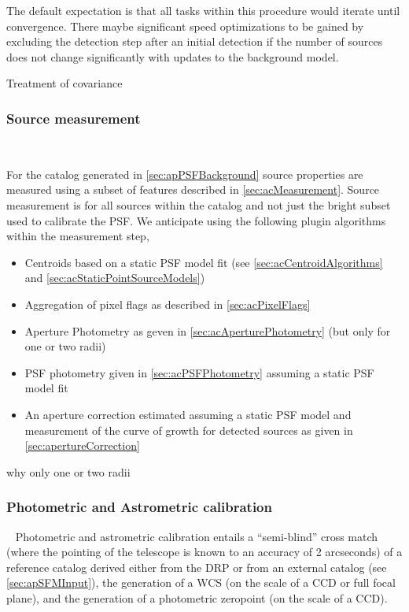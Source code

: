 The default expectation is that all tasks within this procedure would iterate until convergence.  There maybe significant speed optimizations to be gained by excluding the \Source detection step after an initial detection if the number of sources does not change significantly with updates to the background model.

\begin{note} Treatment of covariance \end{note}


\subsubsection{Source measurement}~
\label{sec:apSourcemeasurement}

For the \Source catalog generated in \ref{sec:apPSFBackground} source properties are measured using a subset of features described in \ref{sec:acMeasurement}. Source measurement is for all sources within the \Source catalog and not just the bright subset used to calibrate the PSF.  We anticipate using the following plugin algorithms within the \Source measurement step,
\begin{itemize}
\item Centroids based on a static PSF model fit (see \ref{sec:acCentroidAlgorithms} and \ref{sec:acStaticPointSourceModels})
\item Aggregation of pixel flags as described in \ref{sec:acPixelFlags}
\item Aperture Photometry as geven in \ref{sec:acAperturePhotometry} (but only for one or two radii) 
\item PSF photometry given in \ref{sec:acPSFPhotometry} assuming a static PSF model fit
\item  An aperture correction estimated assuming a static PSF model and measurement of the curve of growth for  detected sources as given in \ref{sec:apertureCorrection}
\end{itemize}

\begin{note} why only one or two radii \end{note}


\subsubsection{Photometric and Astrometric calibration}~ 
Photometric and astrometric calibration entails a ``semi-blind'' cross match (where the pointing of the telescope is known to an accuracy of 2 arcseconds) of a reference catalog derived either from the DRP \Objects or from an external catalog (see \ref{sec:apSFMInput}), the generation of a WCS (on the scale of a CCD or full focal plane), and the generation of a photometric zeropoint (on the scale of a CCD).

